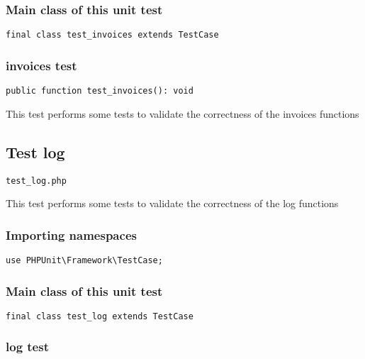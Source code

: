 \documentclass[a4paper]{article}
\begin{document}
\subsubsection{Main class of this unit test}

\begin{lstlisting}
final class test_invoices extends TestCase
\end{lstlisting}

\hypertarget{toc253}{}
\subsubsection{invoices test}

\begin{lstlisting}
public function test_invoices(): void
\end{lstlisting}

This test performs some tests to validate the correctness
of the invoices functions

\hypertarget{toc254}{}
\subsection{Test log}

\begin{lstlisting}
test_log.php
\end{lstlisting}

This test performs some tests to validate the correctness
of the log functions

\hypertarget{toc255}{}
\subsubsection{Importing namespaces}

\begin{lstlisting}
use PHPUnit\Framework\TestCase;
\end{lstlisting}

\hypertarget{toc256}{}
\subsubsection{Main class of this unit test}

\begin{lstlisting}
final class test_log extends TestCase
\end{lstlisting}

\hypertarget{toc257}{}
\subsubsection{log test}
\end{document}
